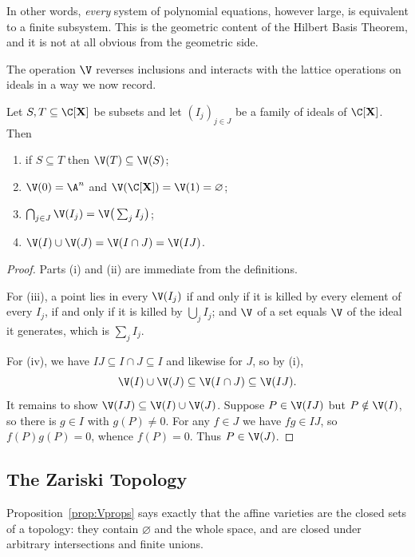 In other words, \emph{every} system of polynomial equations, however large, is equivalent to a finite subsystem. This is the geometric content of the Hilbert Basis Theorem, and it is not at all obvious from the geometric side.

The operation $\V$ reverses inclusions and interacts with the lattice operations on ideals in a way we now record.

\begin{proposition}\label{prop:Vprops}
	Let $S, T \subseteq \C[\mathbf{X}]$ be subsets and let $(I_j)_{j \in J}$ be a family of ideals of $\C[\mathbf{X}]$. Then
	\begin{enumerate}[label=(\roman*)]
		\item if $S \subseteq T$ then $\V(T) \subseteq \V(S)$;
		\item $\V(0) = \A^n$ and $\V(\C[\mathbf{X}]) = \V(1) = \varnothing$;
		\item $\bigcap_{j \in J} \V(I_j) = \V\big(\sum_{j} I_j\big)$;
		\item $\V(I) \cup \V(J) = \V(I \cap J) = \V(IJ)$.
	\end{enumerate}
\end{proposition}

\begin{proof}
	Parts (i) and (ii) are immediate from the definitions.

	For (iii), a point lies in every $\V(I_j)$ if and only if it is killed by every element of every $I_j$, if and only if it is killed by $\bigcup_j I_j$; and $\V$ of a set equals $\V$ of the ideal it generates, which is $\sum_j I_j$.

	For (iv), we have $IJ \subseteq I \cap J \subseteq I$ and likewise for $J$, so by (i),
	$$\V(I) \cup \V(J) \subseteq \V(I\cap J) \subseteq \V(IJ).$$
	It remains to show $\V(IJ) \subseteq \V(I) \cup \V(J)$. Suppose $P \in \V(IJ)$ but $P \notin \V(I)$, so there is $g \in I$ with $g(P) \neq 0$. For any $f \in J$ we have $fg \in IJ$, so $f(P)g(P) = 0$, whence $f(P) = 0$. Thus $P \in \V(J)$.
\end{proof}

\subsection{The Zariski Topology}

Proposition~\ref{prop:Vprops} says exactly that the affine varieties are the closed sets of a topology: they contain $\varnothing$ and the whole space, and are closed under arbitrary intersections and finite unions.

